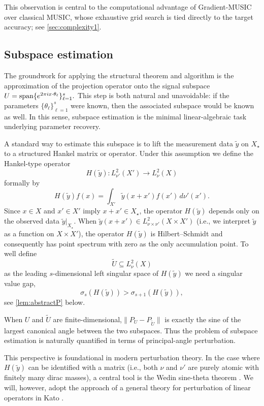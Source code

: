 \documentclass[11pt]{article}
\theoremstyle{definition}
\numberwithin{theorem}{section}
\numberwithin{lemma}{section}
\numberwithin{equation}{section}
\renewcommand{\subset}{\subseteq}
\renewcommand{\tilde}{\widetilde}
\newcommand{\sampset}{X}
\newcommand{\spann}{{\rm span}}
\numberwithin{equation}{section}
\begin{document}
This observation is central to the computational advantage of Gradient-MUSIC over classical MUSIC, whose exhaustive grid search is tied directly to the target accuracy; see \cref{sec:complexity1}. 

\subsection{Subspace estimation}
\label{sec:subspace}


The groundwork  for applying the structural theorem and algorithm is the approximation of the projection operator onto the signal subspace $U=\spann\{e^{2\pi i x\cdot \theta_\ell}\}_{\ell=1}^s.$
This step is both natural and unavoidable: if the parameters $\{\theta_\ell\}_{\ell=1}^s$ were known, then the associated subspace would be known as well. In this sense, subspace estimation is the minimal linear-algebraic task underlying parameter recovery.



A standard way to estimate this subspace is to lift the measurement data $\tilde y$ on $\sampset_\star$ to a structured Hankel matrix or operator. 
 Under this assumption we define the Hankel-type operator
\[
H(\tilde y)\colon L^2_{\nu'}(X')\to L^2_\nu(X)
\]
formally by
\begin{equation}
\label{eq:hankel}
H(\tilde y)f(x)=\int_{X'} \tilde y(x+x')f(x')\,d\nu'(x').
\end{equation}
Since $x\in X$ and $x'\in X'$ imply $x+x'\in \sampset_\star$, the operator $H(\tilde y)$ depends only on the observed data $\tilde y|_{\sampset_\star}$. When $\tilde y(x+x')\in L^2_{\nu\times \nu'}(X\times X')$ (i.e., we interpret $\tilde y$ as a function on $X\times X'$), the operator $H(\tilde y)$ is Hilbert--Schmidt and consequently has point spectrum with zero as the only accumulation point. 
To well define
$$
\tilde U\subset L^2_\nu(X)
$$
as the leading $s$-dimensional left singular space of $H(\tilde y)$ we need a singular value gap, 
\begin{equation}
	\label{eq:siggap}
	\sigma_s(H(\tilde y))> \sigma_{s+1}(H(\tilde y)),
\end{equation}
see  \cref{lem:abstractP} below. 

When $U$ and $\tilde U$ are finite-dimensional,$\|P_U-P_{\tilde U}\|$ 
 is exactly the sine of the largest canonical angle between the two subspaces. Thus the problem of subspace estimation is naturally quantified in terms of principal-angle perturbation.


This perspective is foundational in modern perturbation theory. In the case where $H(\tilde y)$ can be identified with a matrix (i.e., both $\nu$ and $\nu'$ are purely atomic with finitely many dirac masses), a central tool is the Wedin sine-theta theorem  \cite{stewart1990matrix}. We will, however, adopt the approach of a  general theory for perturbation of linear operators in Kato \cite[Theorem 3.18 on page 214]{kato2013perturbation}.
\end{document}
